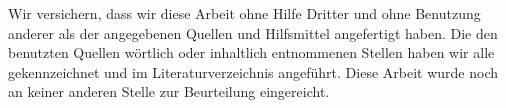 Wir versichern, dass wir diese Arbeit ohne Hilfe Dritter und ohne Benutzung anderer als der angegebenen Quellen 
und Hilfsmittel angefertigt haben. Die den benutzten Quellen wörtlich oder inhaltlich entnommenen Stellen haben 
wir alle gekennzeichnet und im Literaturverzeichnis angeführt. Diese Arbeit wurde noch an keiner anderen Stelle 
zur Beurteilung eingereicht.
